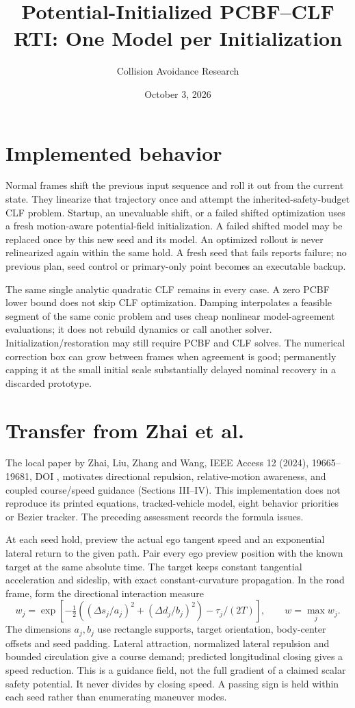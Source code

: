 \documentclass[10pt]{article}
\title{Potential-Initialized PCBF--CLF RTI: One Model per Initialization}
\author{Collision Avoidance Research}
\date{October 3, 2026}
\begin{document}
\maketitle
\section{Implemented behavior}
Normal frames shift the previous input sequence and roll it out from the current
state. They linearize that trajectory once and attempt the inherited-safety-budget
CLF problem. Startup, an unevaluable shift, or a failed shifted optimization uses
a fresh motion-aware potential-field initialization. A failed shifted model may
be replaced once by this new seed and its model. An optimized rollout is never
relinearized again within the same hold. A fresh seed that fails reports failure;
no previous plan, seed control or primary-only point becomes an executable backup.

The same single analytic quadratic CLF remains in every case. A zero PCBF lower
bound does not skip CLF optimization. Damping interpolates a feasible segment
of the same conic problem and uses cheap nonlinear model-agreement evaluations;
it does not rebuild dynamics or call another solver. Initialization/restoration
may still require PCBF and CLF solves. The numerical correction box can grow
between frames when agreement is good; permanently capping it at the small
initial scale substantially delayed nominal recovery in a discarded prototype.

\section{Transfer from Zhai et al.}
The local paper by Zhai, Liu, Zhang and Wang, IEEE Access 12 (2024),
19665--19681, DOI , motivates directional repulsion,
relative-motion awareness, and coupled course/speed guidance (Sections III--IV).
This implementation does not reproduce its printed equations, tracked-vehicle
model, eight behavior priorities or Bezier tracker. The preceding assessment
 records the formula issues.

At each seed hold, preview the actual ego tangent speed and an exponential
lateral return to the given path. Pair every ego preview position with the known
target at the same absolute time. The target keeps constant tangential
acceleration and sideslip, with exact constant-curvature propagation. In the
road frame, form the directional interaction measure
\[
 w_j=\exp\!\left[-\tfrac12\left((\Delta s_j/a_j)^2+
 (\Delta d_j/b_j)^2\right)-\tau_j/(2T)\right],\qquad w=\max_jw_j.
\]
The dimensions $a_j,b_j$ use rectangle supports, target orientation, body-center
offsets and seed padding. Lateral attraction, normalized lateral repulsion and
bounded circulation give a course demand; predicted longitudinal closing gives
a speed reduction. This is a guidance field, not the full gradient of a claimed
scalar safety potential. It never divides by closing speed. A passing sign is
held within each seed rather than enumerating maneuver modes.
\end{document}
